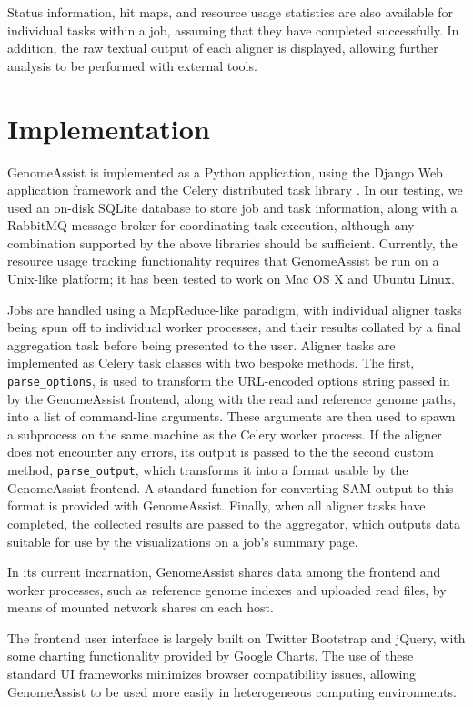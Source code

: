 \documentclass[11pt,twocolumn]{article}
\begin{document}
Status information, hit maps, and resource usage statistics are also
available for individual tasks within a job, assuming that they have
completed successfully.
In addition, the raw textual output of each aligner is displayed,
allowing further analysis to be performed with external tools.


\section{Implementation}
\label{sec:implementation}

GenomeAssist is implemented as a Python application, using the Django
Web application framework \cite{Django} and the Celery distributed task
library \cite{Celery}.
In our testing, we used an on-disk SQLite database to store job and task
information, along with a RabbitMQ message broker for coordinating task
execution, although any combination supported by the above libraries
should be sufficient.
Currently, the resource usage tracking functionality requires that
GenomeAssist be run on a Unix-like platform; it has been tested to work
on Mac OS X and Ubuntu Linux.

Jobs are handled using a MapReduce-like paradigm, with individual
aligner tasks being spun off to individual worker processes, and their
results collated by a final aggregation task before being presented to
the user.
Aligner tasks are implemented as Celery task classes with two bespoke
methods.
The first, \texttt{parse\_options}, is used to transform the URL-encoded
options string passed in by the GenomeAssist frontend, along with the
read and reference genome paths, into a list of command-line arguments.
These arguments are then used to spawn a subprocess on the same machine
as the Celery worker process.
If the aligner does not encounter any errors, its output is passed to
the the second custom method, \texttt{parse\_output}, which transforms
it into a format usable by the GenomeAssist frontend.
A standard function for converting SAM output to this format is
provided with GenomeAssist.
Finally, when all aligner tasks have completed, the collected results
are passed to the aggregator, which outputs data suitable for use by the
visualizations on a job's summary page.

In its current incarnation, GenomeAssist shares data among the frontend
and worker processes, such as reference genome indexes and uploaded read
files, by means of mounted network shares on each host.

The frontend user interface is largely built on Twitter Bootstrap and
jQuery, with some charting functionality provided by Google Charts.
The use of these standard UI frameworks minimizes browser compatibility
issues, allowing GenomeAssist to be used more easily in heterogeneous
computing environments.
\end{document}
